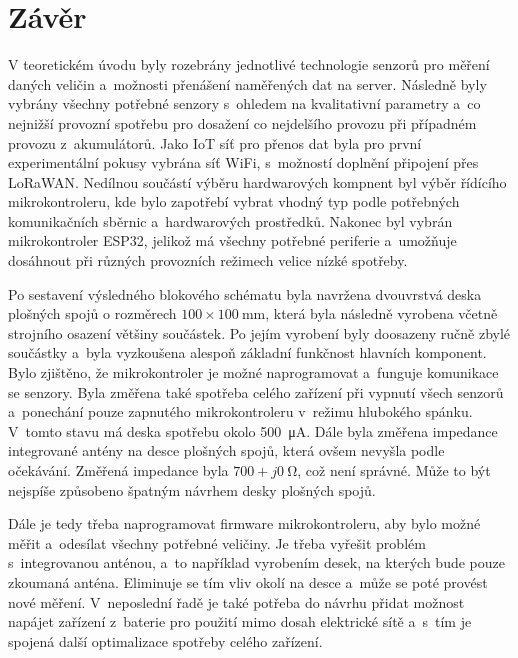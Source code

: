 \chapter*{Závěr}
{}

V teoretickém úvodu byly rozebrány jednotlivé technologie senzorů pro měření daných veličin a~možnosti přenášení naměřených dat na server. Následně byly vybrány všechny potřebné senzory s~ohledem na kvalitativní parametry a~co nejnižší provozní spotřebu pro dosažení co nejdelšího provozu při případném provozu z~akumulátorů. Jako IoT síť pro přenos dat byla pro první experimentální pokusy vybrána síť WiFi, s~možností doplnění připojení přes LoRaWAN. Nedílnou součástí výběru hardwarových kompnent byl výběr řídícího mikrokontroleru, kde bylo zapotřebí vybrat vhodný typ podle potřebných komunikačních sběrnic a~hardwarových prostředků. Nakonec byl vybrán mikrokontroler ESP32, jelikož má všechny potřebné periferie a~umožňuje dosáhnout při různých provozních režimech velice nízké spotřeby.

Po sestavení výsledného blokového schématu byla navržena dvouvrstvá deska plošných spojů o rozměrech $100\times\SI{100}{\milli\metre}$, která byla následně vyrobena včetně strojního osazení většiny součástek. Po jejím vyrobení byly doosazeny ručně zbylé součástky a~byla vyzkoušena alespoň základní funkčnost hlavních komponent. Bylo zjištěno, že mikrokontroler je možné naprogramovat a~funguje komunikace se senzory. Byla změřena také spotřeba celého zařízení při vypnutí všech senzorů a~ponechání pouze zapnutého mikrokontroleru v~režimu hlubokého spánku. V~tomto stavu má deska spotřebu okolo \SI{500}{\micro\ampere}. Dále byla změřena impedance integrované antény na desce plošných spojů, která ovšem nevyšla podle očekávání. Změřená impedance byla $700+j\SI{0}{\ohm}$, což není správné. Může to být nejspíše způsobeno špatným návrhem desky plošných spojů.

Dále je tedy třeba naprogramovat firmware mikrokontroleru, aby bylo možné měřit a~odesílat všechny potřebné veličiny. Je třeba vyřešit problém s~integrovanou anténou, a~to například vyrobením desek, na kterých bude pouze zkoumaná anténa. Eliminuje se tím vliv okolí na desce a~může se poté provést nové měření. V~neposlední řadě je také potřeba do návrhu přidat možnost napájet zařízení z~baterie pro použití mimo dosah elektrické sítě a~s~tím je spojená další optimalizace spotřeby celého zařízení.